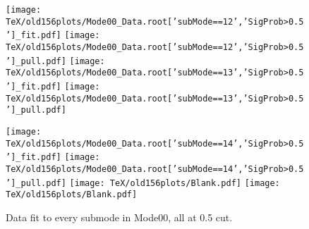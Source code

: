 \documentclass{article}
\begin{document}
\begin{figure}[p!]
\begin{center}
\texttt{[image: TeX/old156plots/Mode00\_Data.root['subMode==12','SigProb>0.5']\_fit.pdf]}
\texttt{[image: TeX/old156plots/Mode00\_Data.root['subMode==12','SigProb>0.5']\_pull.pdf]}
\texttt{[image: TeX/old156plots/Mode00\_Data.root['subMode==13','SigProb>0.5']\_fit.pdf]}
\texttt{[image: TeX/old156plots/Mode00\_Data.root['subMode==13','SigProb>0.5']\_pull.pdf]}

\texttt{[image: TeX/old156plots/Mode00\_Data.root['subMode==14','SigProb>0.5']\_fit.pdf]}
\texttt{[image: TeX/old156plots/Mode00\_Data.root['subMode==14','SigProb>0.5']\_pull.pdf]}
\texttt{[image: TeX/old156plots/Blank.pdf]}
\texttt{[image: TeX/old156plots/Blank.pdf]}
\caption{Data fit to every submode in Mode00, all at 0.5 cut.} 
\label{fig:fitPlotsMode00}
\end{center}
\end{figure}
\end{document}
